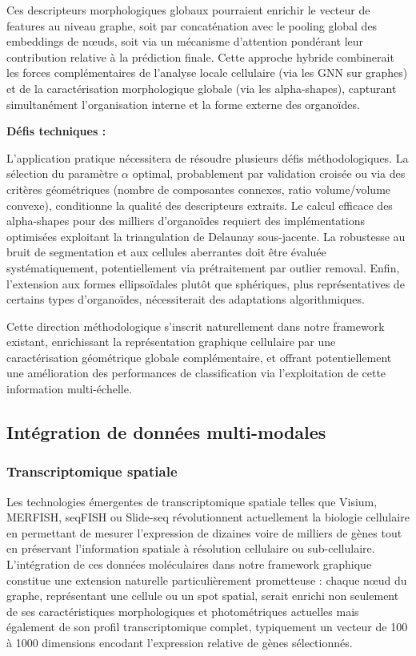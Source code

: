 Ces descripteurs morphologiques globaux pourraient enrichir le vecteur de features au niveau graphe, soit par concaténation avec le pooling global des embeddings de nœuds, soit via un mécanisme d'attention pondérant leur contribution relative à la prédiction finale. Cette approche hybride combinerait les forces complémentaires de l'analyse locale cellulaire (via les GNN sur graphes) et de la caractérisation morphologique globale (via les alpha-shapes), capturant simultanément l'organisation interne et la forme externe des organoïdes.

\textbf{Défis techniques :}

L'application pratique nécessitera de résoudre plusieurs défis méthodologiques. La sélection du paramètre $\alpha$ optimal, probablement par validation croisée ou via des critères géométriques (nombre de composantes connexes, ratio volume/volume convexe), conditionne la qualité des descripteurs extraits. Le calcul efficace des alpha-shapes pour des milliers d'organoïdes requiert des implémentations optimisées exploitant la triangulation de Delaunay sous-jacente. La robustesse au bruit de segmentation et aux cellules aberrantes doit être évaluée systématiquement, potentiellement via prétraitement par outlier removal. Enfin, l'extension aux formes ellipsoïdales plutôt que sphériques, plus représentatives de certains types d'organoïdes, nécessiterait des adaptations algorithmiques.

Cette direction méthodologique s'inscrit naturellement dans notre framework existant, enrichissant la représentation graphique cellulaire par une caractérisation géométrique globale complémentaire, et offrant potentiellement une amélioration des performances de classification via l'exploitation de cette information multi-échelle.

\subsection{Intégration de données multi-modales}

\subsubsection{Transcriptomique spatiale}

Les technologies émergentes de transcriptomique spatiale telles que Visium, MERFISH, seqFISH ou Slide-seq révolutionnent actuellement la biologie cellulaire en permettant de mesurer l'expression de dizaines voire de milliers de gènes tout en préservant l'information spatiale à résolution cellulaire ou sub-cellulaire. L'intégration de ces données moléculaires dans notre framework graphique constitue une extension naturelle particulièrement prometteuse : chaque nœud du graphe, représentant une cellule ou un spot spatial, serait enrichi non seulement de ses caractéristiques morphologiques et photométriques actuelles mais également de son profil transcriptomique complet, typiquement un vecteur de 100 à 1000 dimensions encodant l'expression relative de gènes sélectionnés.

